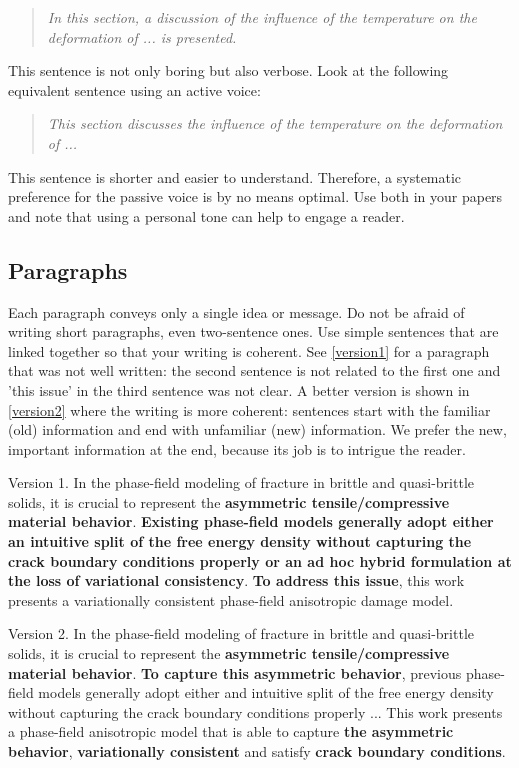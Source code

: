 \documentclass[authoryear,12pta4paper,fleqn]{article}
\numberwithin{equation}{section}
\theoremstyle{remark}
\begin{document}
\begin{quote}
\textit{In this section, a discussion of the influence of the temperature on the deformation of ... is presented.}
\end{quote}
This sentence is not only boring but also verbose. Look at the following equivalent sentence using an active voice:

\begin{quote}
\textit{This section discusses the influence of the temperature on the deformation of ...}
\end{quote}
This sentence is shorter and easier to understand. Therefore, a systematic preference for the passive voice is by no means optimal. Use both in your papers and note that using a personal tone can help to engage a reader. 

\subsection{Paragraphs}\label{sec:paragraph}

Each paragraph conveys only a single idea or message. Do not be afraid of writing short paragraphs, even two-sentence ones. 
Use simple sentences that are linked together so that your writing is coherent. 
See \cref{version1} for a paragraph that was not well written: the second sentence is not related to the first one and 'this issue' in the third sentence was not clear. A better version is shown in \cref{version2} where the writing is more coherent: sentences start with the familiar (old) information and end with unfamiliar (new) information. We prefer the new, important information at the end, because its job is to intrigue the reader. 

\begin{MyBox}[width=0.48\textwidth,nobeforeafter,label={version1}]
{Version 1.}
{
In the phase-field modeling of fracture in brittle and quasi-brittle solids, it is crucial to represent the \textbf{asymmetric tensile/compressive material behavior}. \textbf{Existing phase-field models generally adopt either an intuitive split of the free energy density without capturing the crack boundary conditions properly or an ad hoc hybrid formulation at the loss of variational consistency}. \textbf{To address this issue}, this work presents a variationally consistent phase-field anisotropic damage model.}
\end{MyBox}\hfill
\begin{MyBox}[width=0.48\textwidth,nobeforeafter,label={version2}]
{Version 2.}
{
In the phase-field modeling of fracture in brittle and quasi-brittle solids, it is crucial to represent the \textbf{asymmetric tensile/compressive material behavior}. \textbf{To capture this asymmetric behavior}, previous phase-field models  generally adopt either and intuitive split of the free energy density without capturing the crack boundary conditions properly ... This work presents a phase-field anisotropic model that is able to capture \textbf{the asymmetric behavior}, \textbf{variationally consistent} and satisfy \textbf{crack boundary conditions}.}
\end{MyBox}
\end{document}
